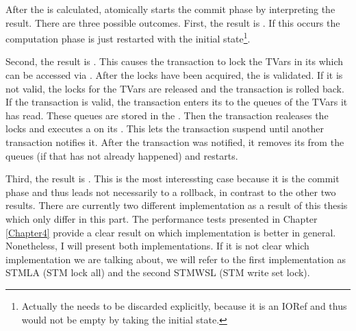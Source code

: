 After the  is calculated, atomically starts the commit phase by interpreting
the result. There are three possible outcomes.
First, the result is . If this occurs the computation phase is just restarted 
with the initial state\footnote{Actually the  needs to be discarded explicitly,
because it is an IORef and thus would not be empty by taking the initial state.}. 

Second, the result is . This causes the transaction to lock the TVars in its 
 which can be accessed via . After the locks have been acquired, 
the  is validated. If it is not valid, the locks for the TVars are released and
the transaction is rolled back. If the transaction is 
valid, the transaction enters its  to the queues of the TVars it has read.
These queues are stored in the . Then the transaction realeases the locks and 
executes a  on its . This lets the transaction suspend until
another transaction notifies it. After the transaction was notified, it removes its 
 from the queues (if that has not already happened) and restarts.

Third, the result is . This is the most interessting case
because it is the commit phase and thus leads not necessarily to a rollback, in contrast to 
the other two results. 
There are currently two different implementation as a result of this thesis which 
only differ in this part. The performance tests presented in Chapter \ref{Chapter4} 
provide a clear result on which implementation is better in general. Nonetheless, I will present
both implementations. If it is not clear which implementation we are talking about,
we will refer to the first implementation as STMLA (STM lock all) and the second STMWSL 
(STM write set lock). 

